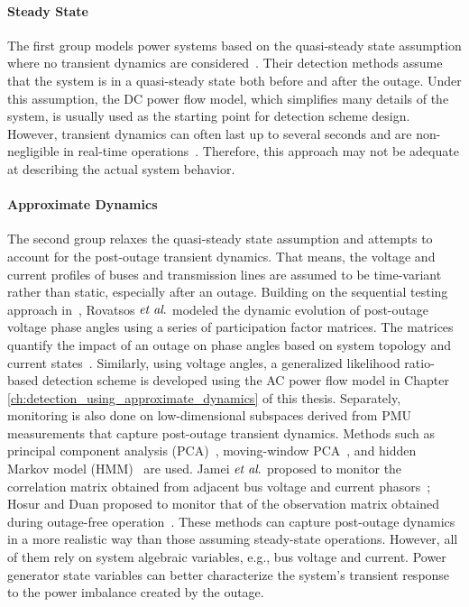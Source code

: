 \paragraph{Steady State}
The first group models power systems based on the quasi-steady state assumption where no transient dynamics are considered~\cite{Tate2008, tate2009double, babakmehr2015application,Chen2016, ardakanian2017event,Ardakanian2019a}. Their detection methods assume that the system is in a quasi-steady state both before and after the outage. Under this assumption, the DC power flow model, which simplifies many details of the system, is usually used as the starting point for detection scheme design. However, transient dynamics can often last up to several seconds and are non-negligible in real-time operations~\cite{Glover2012}. Therefore, this approach may not be adequate at describing the actual system behavior. 

\paragraph{Approximate Dynamics}
The second group relaxes the quasi-steady state assumption and attempts to account for the post-outage transient dynamics. That means, the voltage and current profiles of buses and transmission lines are assumed to be time-variant rather than static, especially after an outage.
Building on the sequential testing approach in~\cite{Chen2016}, Rovatsos $\textit{et al}.$ modeled the dynamic evolution of post-outage voltage phase angles using a series of participation factor matrices. The matrices quantify the impact of an outage on phase angles based on system topology and current states~\cite{Rovatsos2017}. 
Similarly, using voltage angles, a generalized likelihood ratio-based detection scheme is developed using the AC power flow model in Chapter \ref{ch:detection_using_approximate_dynamics} of this thesis. 
Separately, monitoring is also done on low-dimensional subspaces derived from PMU measurements that capture post-outage transient dynamics. Methods such as principal component analysis (PCA)~\cite{Xie2014}, moving-window PCA~\cite{Rafferty2016}, and hidden Markov model (HMM)~\cite{Huang2016b} are used. Jamei $\textit{et al}.$ proposed to monitor the correlation matrix obtained from adjacent bus voltage and current phasors~\cite{Jamei2017a}; Hosur and Duan proposed to monitor that of the observation matrix obtained during outage-free operation~\cite{Hosur2019}. These methods can capture post-outage dynamics in a more realistic way than those assuming steady-state operations. However, all of them rely on system algebraic variables, e.g., bus voltage and current. Power generator state variables can better characterize the system's transient response to the power imbalance created by the outage.

